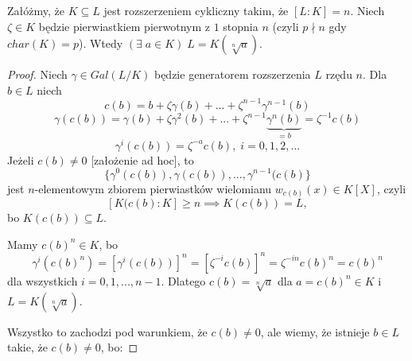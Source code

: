 \begin{theorem}
Załóżmy, że $K\subseteq L$ jest rozszerzeniem cykliczny takim, że $[L:K]=n$. Niech $\zeta\in K$ będzie pierwiastkiem pierwotnym z $1$ stopnia $n$ (czyli $p\nmid n$ gdy $char(K)=p$). Wtedy $(\exists\;a\in K)\;L=K(\sqrt[n]{a})$.
\end{theorem}
\begin{proof}
Niech $\gamma\in Gal(L/K)$ będzie generatorem rozszerzenia $L$ rzędu $n$. Dla $b\in L$ niech 
$$c(b)=b+\zeta\gamma(b)+...+\zeta^{n-1}\gamma^{n-1}(b)$$
$$\gamma(c(b))=\gamma(b)+\zeta\gamma^2(b)+...+\zeta^{n-1}\underbrace{\gamma^n(b)}_{=b}=\zeta^{-1}c(b)$$
$$\gamma^i(c(b))=\zeta^{-a}c(b),\;i=0,1,2,...$$
Jeżeli $c(b)\neq 0$ [założenie ad hoc], to
$$\{\gamma^0(c(b)),\gamma(c(b)), ...,\gamma^{n-1}(c(b)\}$$
jest $n$-elementowym zbiorem pierwiastków wielomianu $w_{c(b)}(x)\in K[X]$, czyli
$$[K(c(b):K]\geq n\implies K(c(b))=L,$$
bo $K(c(b))\subseteq L$. 

Mamy $c(b)^n\in K$, bo 
$$\gamma^i(c(b)^n)=\left[\gamma^i(c(b))\right]^n=[\zeta^{-i}c(b)]^n=\zeta^{-in}c(b)^n=c(b)^n$$
dla wszystkich $i=0,1,...,n-1$. Dlatego $c(b)=\sqrt[n]{a}$ dla $a=c(b)^n\in K$ i $L=K(\sqrt[n]{a})$.

Wszystko to zachodzi pod warunkiem, że $c(b)\neq 0$, ale wiemy, że istnieje $b\in L$ takie, że $c(b)\neq 0$, bo:
\end{proof}

